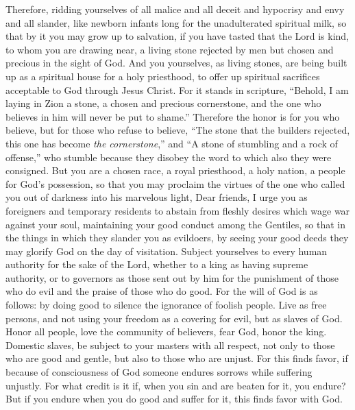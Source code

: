 \begin{biblechapter} %
 Therefore, ridding yourselves of all malice and all deceit and hypocrisy and envy and all slander,
\verse like newborn infants long for the unadulterated spiritual milk, so that by it you may grow up to salvation,
\verse if you have tasted that the Lord is kind,
\verse to whom you are drawing near, a living stone rejected by men but chosen and precious in the sight of God.
\verse And you yourselves, as living stones, are being built up as a spiritual house for a holy priesthood, to offer up spiritual sacrifices acceptable to God through Jesus Christ.
\verse For it stands in scripture, “Behold, I am laying in Zion a stone, a chosen and precious cornerstone, 
and the one who believes in him will never be put to shame.”
\verse Therefore the honor is for you who believe, but for those who refuse to believe, “The stone that the builders rejected, 
this one has become \textit{the cornerstone},”
\verse and “A stone of stumbling and a rock of offense,”
\verse who stumble because they disobey the word to which also they were consigned.
\verse But you are a chosen race, a royal priesthood, a holy nation, a people for God’s possession, so that you may proclaim the virtues of the one who called you out of darkness into his marvelous light,
\verse Dear friends, I urge you as foreigners and temporary residents to abstain from fleshly desires which wage war against your soul,
\verse maintaining your good conduct among the Gentiles, so that in the things in which they slander you as evildoers, by seeing your good deeds they may glorify God on the day of visitation.
 Subject yourselves to every human authority for the sake of the Lord, whether to a king as having supreme authority,
\verse or to governors as those sent out by him for the punishment of those who do evil and the praise of those who do good.
\verse For the will of God is as follows: by doing good to silence the ignorance of foolish people.
\verse Live as free persons, and not using your freedom as a covering for evil, but as slaves of God.
\verse Honor all people, love the community of believers, fear God, honor the king.
\verse Domestic slaves, be subject to your masters with all respect, not only to those who are good and gentle, but also to those who are unjust.
\verse For this finds favor, if because of consciousness of God someone endures sorrows while suffering unjustly.
\verse For what credit is it if, when you sin and are beaten for it, you endure? But if you endure when you do good and suffer for it, this finds favor with God.

\end{biblechapter}
